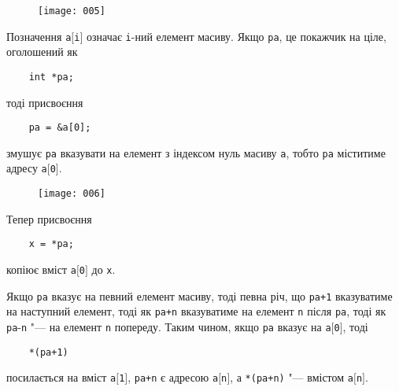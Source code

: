 \documentclass[a4paper,12pt]{book}
\begin{document}

  \begin{figure}[!htb]
  \centering
  \texttt{[image: 005]}
  \end{figure}

  Позначення \texttt{a\mbox{$[$}i\mbox{$]$}} означає \texttt{i}-ний елемент масиву. Якщо
  \texttt{pa}, це покажчик на ціле, оголошений як
  \begin{verbatim}
    int *pa;
  \end{verbatim}
  тоді присвоєння
  \begin{verbatim}
    pa = &a[0];
  \end{verbatim}
  змушує \texttt{pa} вказувати на елемент з індексом нуль масиву \texttt{a}, тобто
  \texttt{pa} міститиме адресу \texttt{a\mbox{$[$}0\mbox{$]$}}.


  \begin{figure}[!htb]
  \centering
  \texttt{[image: 006]}
  \end{figure}

  Тепер присвоєння
  \begin{verbatim}
    x = *pa;
  \end{verbatim}
  копіює вміст \texttt{a\mbox{$[$}0\mbox{$]$}} до \texttt{x}.

  Якщо
  \texttt{pa} вказує на певний елемент масиву, тоді певна річ, що \texttt{pa+1}
  вказуватиме на наступний елемент, тоді як \texttt{pa+n} вказуватиме на елемент
  \texttt{n} після \texttt{pa}, тоді як \texttt{pa}-\texttt{n} "--- на елемент \texttt{n}
  попереду. Таким чином, якщо \texttt{pa} вказує на \texttt{a\mbox{$[$}0\mbox{$]$}}, тоді
  \begin{verbatim}
    *(pa+1)
  \end{verbatim}
  посилається на вміст \texttt{a\mbox{$[$}1\mbox{$]$}}, \texttt{pa+n} є адресою
  \texttt{a\mbox{$[$}n\mbox{$]$}}, а \texttt{*(pa+n)} "--- вмістом
  \texttt{a\mbox{$[$}n\mbox{$]$}}.
\end{document}
